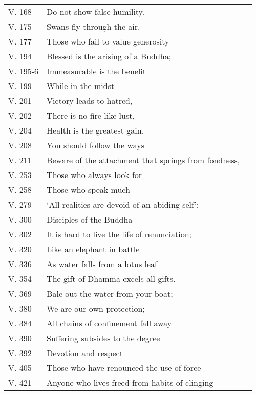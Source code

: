 {\begin{longtable}[c]{llr}
V. 168 & Do not show false humility. & \pageref{dhp-168}\\
V. 175 & Swans fly through the air. & \pageref{dhp-175}\\
V. 177 & Those who fail to value generosity & \pageref{dhp-177}\\
V. 194 & Blessed is the arising of a Buddha; & \pageref{dhp-194}\\
V. 195-6 & Immeasurable is the benefit & \pageref{dhp-195}\\
V. 199 & While in the midst & \pageref{dhp-199}\\
V. 201 & Victory leads to hatred, & \pageref{dhp-201}\\
V. 202 & There is no fire like lust, & \pageref{dhp-202}\\
V. 204 & Health is the greatest gain. & \pageref{dhp-204}\\
V. 208 & You should follow the ways & \pageref{dhp-208}\\
V. 211 & Beware of the attachment that springs from fondness, & \pageref{dhp-211}\\
V. 253 & Those who always look for & \pageref{dhp-253}\\
V. 258 & Those who speak much & \pageref{dhp-258}\\
V. 279 & `All realities are devoid of an abiding self'; & \pageref{dhp-279}\\
V. 300 & Disciples of the Buddha & \pageref{dhp-300}\\
V. 302 & It is hard to live the life of renunciation; & \pageref{dhp-302}\\
V. 320 & Like an elephant in battle & \pageref{dhp-320}\\
V. 336 & As water falls from a lotus leaf & \pageref{dhp-336}\\
V. 354 & The gift of Dhamma excels all gifts. & \pageref{dhp-354}\\
V. 369 & Bale out the water from your boat; & \pageref{dhp-369}\\
V. 380 & We are our own protection; & \pageref{dhp-380}\\
V. 384 & All chains of confinement fall away & \pageref{dhp-384}\\
V. 390 & Suffering subsides to the degree & \pageref{dhp-390}\\
V. 392 & Devotion and respect & \pageref{dhp-392}\\
V. 405 & Those who have renounced the use of force & \pageref{dhp-405}\\
V. 421 & Anyone who lives freed from habits of clinging & \pageref{dhp-421}\\
\end{longtable}

}


